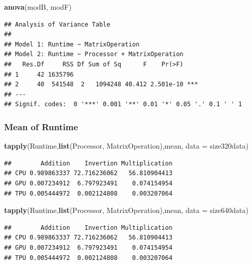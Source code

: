 \documentclass[
]{article}
\newenvironment{Shaded}{\begin{snugshade}}{\end{snugshade}}
\newcommand{\DataTypeTok}[1]{\textcolor[rgb]{0.13,0.29,0.53}{#1}}
\newcommand{\KeywordTok}[1]{\textcolor[rgb]{0.13,0.29,0.53}{\textbf{#1}}}
\newcommand{\NormalTok}[1]{#1}
\begin{document}
\begin{Shaded}
\begin{Highlighting}[]
\KeywordTok{anova}\NormalTok{(modB, modF)}
\end{Highlighting}
\end{Shaded}

\begin{verbatim}
## Analysis of Variance Table
## 
## Model 1: Runtime ~ MatrixOperation
## Model 2: Runtime ~ Processor + MatrixOperation
##   Res.Df     RSS Df Sum of Sq      F    Pr(>F)    
## 1     42 1635796                                  
## 2     40  541548  2   1094248 40.412 2.501e-10 ***
## ---
## Signif. codes:  0 '***' 0.001 '**' 0.01 '*' 0.05 '.' 0.1 ' ' 1
\end{verbatim}

\hypertarget{mean-of-runtime}{%
\subsubsection{Mean of Runtime}\label{mean-of-runtime}}

\begin{Shaded}
\begin{Highlighting}[]
\KeywordTok{tapply}\NormalTok{(Runtime,}\KeywordTok{list}\NormalTok{(Processor, MatrixOperation),mean, }\DataTypeTok{data =}\NormalTok{ size320data)}
\end{Highlighting}
\end{Shaded}

\begin{verbatim}
##        Addition    Invertion Multiplication
## CPU 0.989863337 72.716236062   56.810904413
## GPU 0.007234912  6.797923491    0.074154954
## TPU 0.005444972  0.002124808    0.003207064
\end{verbatim}

\begin{Shaded}
\begin{Highlighting}[]
\KeywordTok{tapply}\NormalTok{(Runtime,}\KeywordTok{list}\NormalTok{(Processor, MatrixOperation),mean, }\DataTypeTok{data =}\NormalTok{ size640data)}
\end{Highlighting}
\end{Shaded}

\begin{verbatim}
##        Addition    Invertion Multiplication
## CPU 0.989863337 72.716236062   56.810904413
## GPU 0.007234912  6.797923491    0.074154954
## TPU 0.005444972  0.002124808    0.003207064
\end{verbatim}
\end{document}
